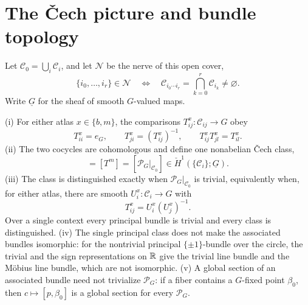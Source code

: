 \section{The \v{C}ech picture and bundle topology}
\label{sec:geo-cech}

Let \(\mathcal C_0=\bigcup_i\mathcal C_i\), and let \(\mathcal N\) be the nerve of this open cover,
\begin{equation}
\{i_0,\ldots,i_r\}\in\mathcal N
\quad\Longleftrightarrow\quad
\mathcal C_{i_0\cdots i_r}=\bigcap_{k=0}^r\mathcal C_{i_k}\neq\varnothing.
\label{eq:geo-nerve}
\end{equation}
Write \(\underline G\) for the sheaf of smooth \(G\)-valued maps.

(i) For either atlas \(x\in\{b,m\}\), the comparisons \(T_{ij}^x:\mathcal C_{ij}\to G\) obey
\begin{equation}
T_{ii}^x=e_G,
\qquad
T_{ji}^x=(T_{ij}^x)^{-1},
\qquad
T_{ij}^xT_{jl}^x=T_{il}^x.
\label{eq:geo-cech-cocycle}
\end{equation}
(ii) The two cocycles are cohomologous and define one nonabelian \v{C}ech class,
\begin{equation}
[T^b]=[T^m]=[\mathscr P_G|_{\mathcal C_0}]
\in\check H^1(\{\mathcal C_i\};\underline G).
\label{eq:geo-cech-class}
\end{equation}
(iii) The class is distinguished exactly when \(\mathscr P_G|_{\mathcal C_0}\) is trivial,
equivalently when, for either atlas, there are smooth \(U_i^x:\mathcal C_i\to G\) with
\begin{equation}
T_{ij}^x=U_i^x(U_j^x)^{-1}.
\label{eq:geo-coboundary-form}
\end{equation}
Over a single context every principal bundle is trivial and every class is distinguished.
(iv) The single principal class does not make the associated bundles isomorphic: for the
nontrivial principal \(\{\pm1\}\)-bundle over the circle, the trivial and the sign representations
on \(\mathbb R\) give the trivial line bundle and the M\"obius line bundle, which are not isomorphic.
(v) A global section of an associated bundle need not trivialize \(\mathscr P_G\): if a fiber
contains a \(G\)-fixed point \(\beta_0\), then \(c\mapsto[p,\beta_0]\) is a global section for every
\(\mathscr P_G\). 

